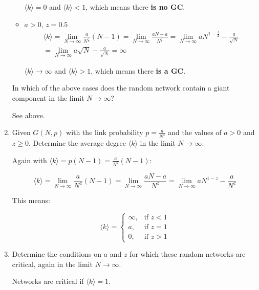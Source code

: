 \begin{enumerate}
\begin{itemize}
			$\langle k \rangle = 0$ and $\langle k \rangle < 1$, which means there \textbf{is no GC}. 
		\item $a>0$,  $z=0.5$
			\begin{equation}
			\begin{split}
				\langle k \rangle 
				= \lim\limits_{N \rightarrow \infty} \frac{a}{N^{\frac{1}{2}}}(N-1) 
				= \lim\limits_{N \rightarrow \infty} \frac{aN - a}{N^{\frac{1}{2}}}
				= \lim\limits_{N \rightarrow \infty} aN^{1-\frac{1}{2}} - \frac{a}{\sqrt{N}}  \\
				= \lim\limits_{N \rightarrow \infty} a\sqrt{N} - \frac{a}{\sqrt{N}} = \infty
			\end{split}
			\end{equation}
			
			$\langle k \rangle \rightarrow \infty$ and $\langle k \rangle > 1$, which means there \textbf{is a GC}. 
	\end{itemize}

	In which of the above cases does the random network contain a giant component in the limit $N \rightarrow \infty$?
	
	See above.
	
	\item Given $G(N,p)$ with the link probability $p = \frac{a}{N^z}$ and the values of $a > 0$ and $z \geq 0$. Determine the average degree $\langle k \rangle$ in the limit $N \rightarrow \infty$.
	
	Again with $\langle k \rangle = p(N-1) = \frac{a}{N^z} (N-1)$:
	
	\begin{equation}
		\langle k \rangle 
		= \lim\limits_{N \rightarrow \infty} \frac{a}{N^z}(N-1)
		= \lim\limits_{N \rightarrow \infty} \frac{aN - a}{N^z}
		= \lim\limits_{N \rightarrow \infty} aN^{1-z} - \frac{a}{N^z}
	\end{equation}
	
	This means:
  
	\[
		\langle k \rangle = 
			\begin{cases}
	   			\infty, & \text{if } z < 1 \\
	   			a, & \text{if }z = 1 \\
	   			0, & \text{if }z > 1
			\end{cases}
	\]

	\item Determine the conditions on $a$ and $z$ for which these random networks are critical,  again in the limit $N \rightarrow \infty$.
	
	Networks are critical if $\langle k \rangle = 1$.
	

\end{enumerate}
